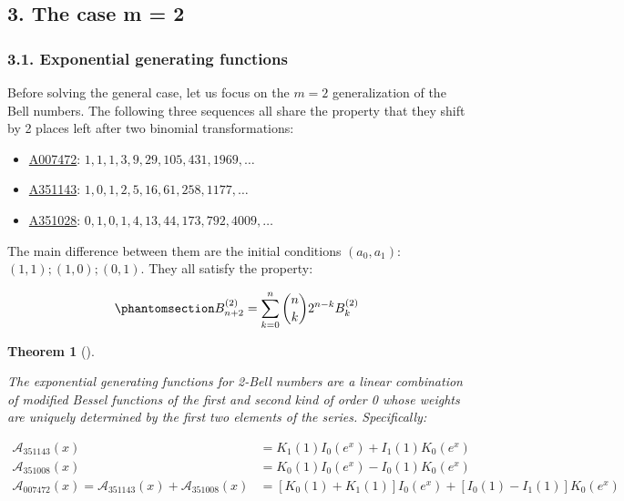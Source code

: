 \documentclass[
  letterpaper,
  DIV=11,
  numbers=noendperiod]{scrartcl}
\theoremstyle{plain}
\newtheorem{theorem}{Theorem}[section]
\theoremstyle{remark}
\begin{document}
\subsection{3. The case m = 2}\label{the-case-m-2}

\subsubsection{3.1. Exponential generating
functions}\label{exponential-generating-functions}

Before solving the general case, let us focus on the \(m=2\)
generalization of the Bell numbers. The following three sequences all
share the property that they shift by 2 places left after two binomial
transformations:

\begin{itemize}
\item
  \href{https://oeis.org/A007472}{A007472}:
  \(1, 1, 1, 3, 9, 29, 105, 431, 1969, \ldots\)
\item
  \href{https://oeis.org/A351143}{A351143}:
  \(1, 0, 1, 2, 5, 16, 61, 258, 1177, \ldots\)
\item
  \href{https://oeis.org/A351028}{A351028}:
  \(0, 1, 0, 1, 4, 13, 44, 173, 792, 4009, \ldots\)
\end{itemize}

The main difference between them are the initial conditions
\((a_0, a_1)\): \((1, 1); (1,0); (0,1)\). They all satisfy the property:

\begin{equation}\phantomsection\label{eq-2bell-recurrence}{
B^{(2)}_{n+2} = \sum_{k=0}^n \binom{n}{k} 2^{n-k} B_k^{(2)}
}\end{equation}

\begin{theorem}[]\protect\hypertarget{thm-m2-egf}{}\label{thm-m2-egf}

\emph{The exponential generating functions for 2-Bell numbers are a
linear combination of modified Bessel functions of the first and second
kind of order 0 whose weights are uniquely determined by the first two
elements of the series. Specifically:}

\[
\begin{aligned}
\mathcal{A}_{351143}(x) &= K_1(1)I_0(e^x) + I_1(1)K_0(e^x) \\
\mathcal{A}_{351008}(x) &= K_0(1)I_0(e^x) - I_0(1)K_0(e^x) \\
\mathcal{A}_{007472}(x) = \mathcal{A}_{351143}(x) + \mathcal{A}_{351008}(x) &= [K_0(1) + K_1(1)]I_0(e^x) + [I_0(1) - I_1(1)]K_0(e^x)
\end{aligned}
\]

\end{theorem}
\end{document}
